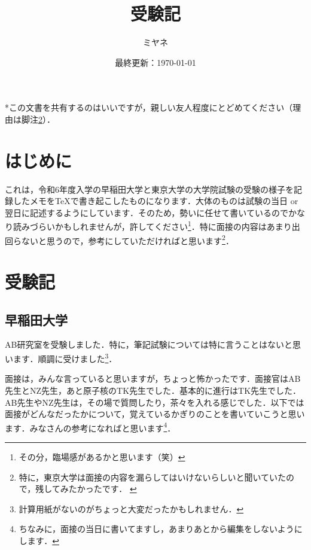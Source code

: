 \documentclass[a4paper,pdflatex,ja=standard]{bxjsarticle}
\title{受験記}
\author{ミヤネ}
\date{最終更新：\today}
\begin{document}
\maketitle

*この文書を共有するのはいいですが，親しい友人程度にとどめてください（理由は脚注\ref{caution}）．

\tableofcontents
\clearpage

\setcounter{section}{-1}

\section{はじめに}

これは，令和6年度入学の早稲田大学と東京大学の大学院試験の受験の様子を記録したメモをTeXで書き起こしたものになります．大体のものは試験の当日 or 翌日に記述するようにしています．そのため，勢いに任せて書いているのでかなり読みづらいかもしれませんが，許してください\footnote{
  その分，臨場感があるかと思います（笑）
}．特に面接の内容はあまり出回らないと思うので，参考にしていただければと思います\footnote{
  特に，東京大学は面接の内容を漏らしてはいけないらしいと聞いていたので，残してみたかったです．
  \label{caution}
}．


\section{受験記}

\subsection{早稲田大学}

AB研究室を受験しました．特に，筆記試験については特に言うことはないと思います．順調に受けました\footnote{
  計算用紙がないのがちょっと大変だったかもしれません．
}．

面接は，みんな言っていると思いますが，ちょっと怖かったです．面接官はAB先生とNZ先生，あと原子核のTK先生でした．基本的に進行はTK先生でした．AB先生やNZ先生は，その場で質問したり，茶々を入れる感じでした．以下では面接がどんなだったかについて，覚えているかぎりのことを書いていこうと思います．みなさんの参考になればと思います\footnote{
  ちなみに，面接の当日に書いてますし，あまりあとから編集をしないようにします．
}．
    
\end{document}
